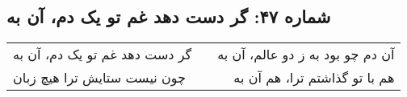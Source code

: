 \begin{center}
\section*{شماره ۴۷: گر دست دهد غم تو یک دم، آن به}
\label{sec:047}
\begin{longtable}{l p{0.5cm} r}
گر دست دهد غم تو یک دم، آن به
&&
آن دم چو بود به ز دو عالم، آن به
\\
چون نیست ستایش ترا هیچ زبان
&&
هم با تو گذاشتم ترا، هم آن به
\\
\end{longtable}
\end{center}

